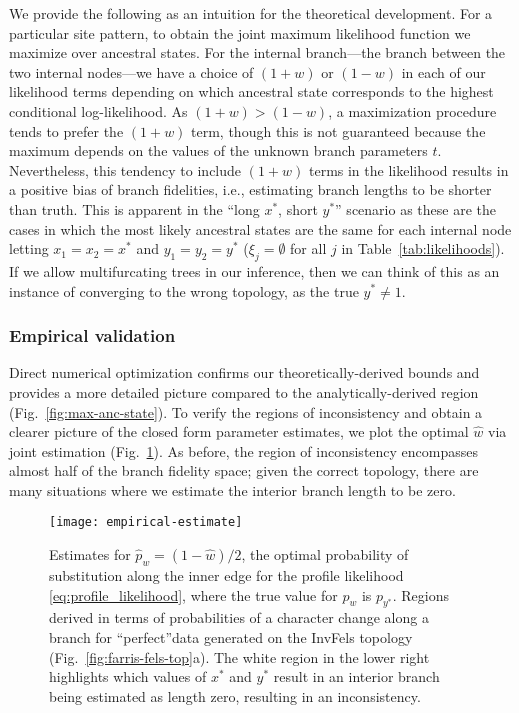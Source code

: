 \documentclass[11pt]{article}
\begin{document}
We provide the following as an intuition for the theoretical development.
For a particular site pattern, to obtain the joint maximum likelihood function we maximize over ancestral states.
For the internal branch---the branch between the two internal nodes---we have a choice of $(1+w)$ or $(1-w)$ in each of our likelihood terms depending on which ancestral state corresponds to the highest conditional log-likelihood.
As $(1+w) > (1-w)$, a maximization procedure tends to prefer the $(1+w)$ term, though this is not guaranteed because the maximum depends on the values of the unknown branch parameters $t$.
Nevertheless, this tendency to include $(1+w)$ terms in the likelihood results in a positive bias of branch fidelities, i.e., estimating branch lengths to be shorter than truth.
This is apparent in the ``long $x^*$, short $y^*$'' scenario as these are the cases in which the most likely ancestral states are the same for each internal node letting $x_1=x_2=x^*$ and $y_1=y_2=y^*$ ($\xi_j=\emptyset$ for all $j$ in Table~\ref{tab:likelihoods}).
If we allow multifurcating trees in our inference, then we can think of this as an instance of converging to the wrong topology, as the true $y^*\neq 1$.

\subsubsection*{Empirical validation}

Direct numerical optimization confirms our theoretically-derived bounds and provides a more detailed picture compared to the analytically\hyp{}derived region (Fig.~\ref{fig:max-anc-state}).
To verify the regions of inconsistency and obtain a clearer picture of the closed form parameter estimates, we plot the optimal $\hat{w}$ via joint estimation (Fig.~\ref{fig:bl-general-inconsistency}).
As before, the region of inconsistency encompasses almost half of the branch fidelity space; given the correct topology, there are many situations where we estimate the interior branch length to be zero.

\begin{figure}
\centering
\texttt{[image: empirical-estimate]}
\caption{
    Estimates for $\hat{p}_w=(1-\hat{w})/2$, the optimal probability of substitution along the inner edge for the profile likelihood \eqref{eq:profile_likelihood}, where the true value for $p_w$ is $p_{y^*}$.
    Regions derived in terms of probabilities of a character change along a branch for ``perfect''data generated on the InvFels topology (Fig.~\ref{fig:farris-fels-top}a).
    The white region in the lower right highlights which values of $x^*$ and $y^*$ result in an interior branch being estimated as length zero, resulting in an inconsistency.
}
\label{fig:bl-general-inconsistency}
\end{figure}
\end{document}
